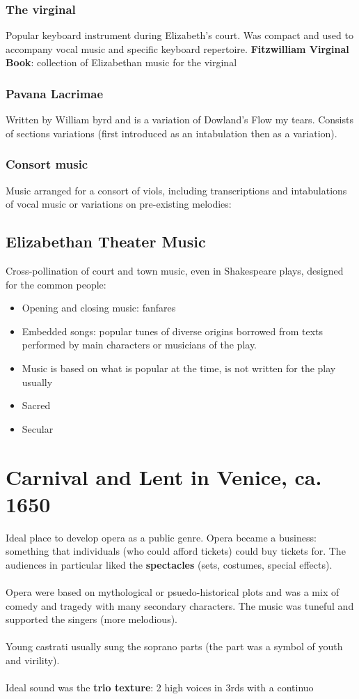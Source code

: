 \documentclass{article}
\begin{document}
  \subsubsection{The virginal}
  Popular keyboard instrument during Elizabeth's court. Was compact and used to accompany vocal music and specific keyboard repertoire. \textbf{Fitzwilliam Virginal Book}: collection of Elizabethan music for the virginal
  \subsubsection{Pavana Lacrimae}
  Written by William byrd and is a variation of Dowland's Flow my tears. Consists of sections variations (first introduced as an intabulation then as a variation).
  \subsubsection{Consort music}
  Music arranged for a consort of viols, including transcriptions and intabulations of vocal music or variations on pre-existing melodies:
  \subsection{Elizabethan Theater Music}
  Cross-pollination of court and town music, even in Shakespeare plays, designed for the common people:
  \begin{itemize}
    \item Opening and closing music: fanfares
    \item Embedded songs: popular tunes of diverse origins borrowed from texts performed by main characters or musicians of the play.
    \item Music is based on what is popular at the time, is not written for the play usually
  \end{itemize}
  \begin{itemize}
    \item Sacred
    \item Secular
  \end{itemize}
  \section{Carnival and Lent in Venice, ca. 1650}
  Ideal place to develop opera as a public genre. Opera became a business: something that individuals (who could afford tickets) could buy tickets for. The audiences in particular liked the \textbf{spectacles} (sets, costumes, special effects). \\ \\
  Opera were based on mythological or psuedo-historical plots and was a mix of comedy and tragedy with many secondary characters. The music was tuneful and supported the singers (more melodious). \\ \\
  Young castrati usually sung the soprano parts (the part was a symbol of youth and virility). \\ \\
  Ideal sound was the \textbf{trio texture}: 2 high voices in 3rds with a continuo
\end{document}
